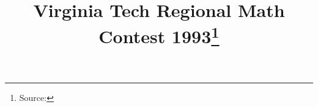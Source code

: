 \documentclass[10pt]{article}
\begin{document}
\title{Virginia Tech Regional Math Contest 1993\footnote{Source: \source}}
\author{\vspace{-2ex}}
\date{\vspace{-6ex}} %
\maketitle








\end{document}
